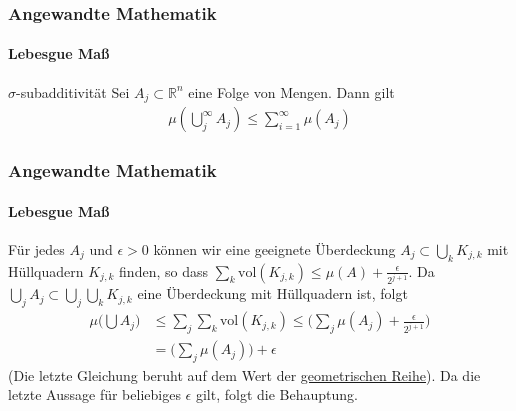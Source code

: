 \documentclass{beamer}
\begin{document}
\begin{frame}
    \frametitle{Angewandte Mathematik}
\framesubtitle{Lebesgue Maß}
    \begin{block}{$\sigma$-subadditivität}
Sei $A_j \subset \mathbb{R}^n$ eine Folge von Mengen. Dann gilt
\begin{align*}
\mu (\bigcup_j^{\infty} A_j ) \leq \sum_{i=1}^{\infty} \mu(A_j)
\end{align*}
\end{block}
 \end{frame}


\begin{frame}
    \frametitle{Angewandte Mathematik}
\framesubtitle{Lebesgue Maß}
    \begin{block}{}
Für jedes $A_j$ und $\epsilon > 0$ können wir  eine geeignete Überdeckung  $A_j \subset \bigcup_k  K_{j,k}$ mit Hüllquadern $K_{j,k}$ finden, so dass 
 $\sum_k \text{vol} (K_{j,k}) \leq \mu(A) + \frac{\epsilon}{2^{j+1}}$.
Da $ \bigcup_j A_j \subset \bigcup_j \bigcup_k  K_{j,k}$ eine Überdeckung mit Hüllquadern ist, folgt
\begin{align*}
\mu \biggl (  \bigcup A_j  \biggr) & \leq \sum_j \sum_k \text{vol} (K_{j,k}) \leq  \bigl( \sum_j  \mu(A_j) + \frac{\epsilon}{2^{j+1}} \bigr)  \\
&= \bigl (\sum_j \mu(A_j) \bigr ) + \epsilon
\end{align*}
(Die letzte Gleichung beruht auf dem Wert der \href{https://de.wikipedia.org/wiki/Geometrische_Reihe}{geometrischen Reihe}).
Da die letzte Aussage für beliebiges $\epsilon$ gilt, folgt die Behauptung.
\end{block}
 \end{frame}
\end{document}
